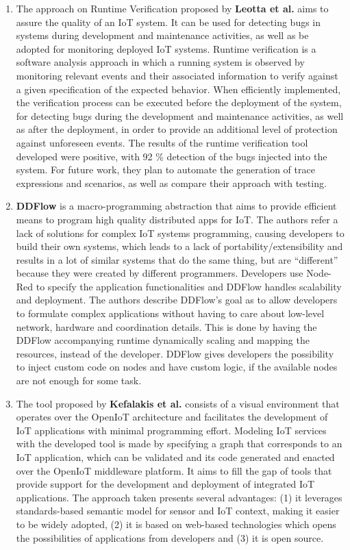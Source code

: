 \begin{enumerate}
    \item The approach on Runtime Verification proposed by \textbf{Leotta et al.} \cite{runtime_verification} aims to assure the quality of an IoT system. It can be used for detecting bugs in systems during development and maintenance activities, as well as be adopted for monitoring deployed IoT systems. Runtime verification is a software analysis approach in which a running system is observed by monitoring relevant events and their associated information to verify against a given specification of the expected behavior. When efficiently implemented, the verification process can be executed before the deployment of the system, for detecting bugs during the development and maintenance activities, as well as after the deployment, in order to provide an additional level of protection against unforeseen events. The results of the runtime verification tool developed were positive, with 92  \% detection of the bugs injected into the system. For future work, they plan to automate the generation of trace expressions and scenarios, as well as compare their approach with testing.
    \item \textbf{DDFlow} \cite{ddflow} is a macro-programming abstraction that aims to provide efficient means to program high quality distributed apps for IoT.
    The authors refer a lack of solutions for complex IoT systems programming, causing developers to build their own systems, which leads to a lack of portability/extensibility and results in a lot of similar systems that do the same thing, but are “different” because they were created by different programmers. Developers use Node-Red to specify the application functionalities and DDFlow handles scalability and deployment. The authors describe DDFlow's goal as to allow developers to formulate complex applications without having to care about low-level network, hardware and coordination details. This is done by having the DDFlow accompanying runtime dynamically scaling and mapping the resources, instead of the developer. DDFlow gives developers the possibility to inject custom code on nodes and have custom logic, if the available nodes are not enough for some task.
    \item The tool proposed by \textbf{Kefalakis et al.} \cite{visual_paradigm_iot_solutions_development} consists of a visual environment that operates over the OpenIoT architecture and facilitates the development of IoT applications with minimal programming effort. Modeling IoT services with the developed tool is made by specifying a graph that corresponds to an IoT application, which can be validated and its code generated and enacted over the OpenIoT middleware platform. It aims to fill the gap of tools that provide support for the development and deployment of integrated IoT applications. The approach taken presents several advantages: (1) it leverages standards-based semantic model for sensor and IoT context, making it easier to be widely adopted, (2) it is based on web-based technologies which opens the possibilities of applications from developers and (3) it is open source. 

\end{enumerate}

